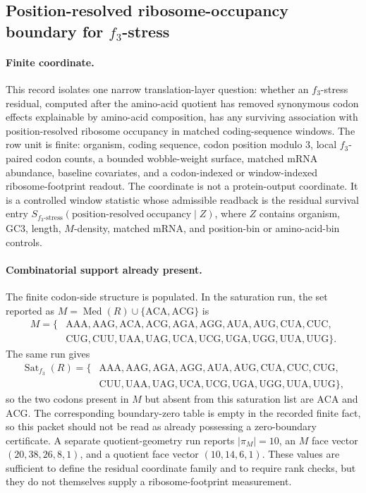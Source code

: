 \subsection{Position-resolved ribosome-occupancy boundary for $f_3$-stress}
\label{sec:q6-f3-stress-position-resolved-ribosome-occupancy-translation-boundary}

\paragraph{Finite coordinate.}
This record isolates one narrow translation-layer question: whether an $f_3$-stress residual, computed after the amino-acid quotient has removed synonymous codon effects explainable by amino-acid composition, has any surviving association with position-resolved ribosome occupancy in matched coding-sequence windows. The row unit is finite: organism, coding sequence, codon position modulo $3$, local $f_3$-paired codon counts, a bounded wobble-weight surface, matched mRNA abundance, baseline covariates, and a codon-indexed or window-indexed ribosome-footprint readout. The coordinate is not a protein-output coordinate. It is a controlled window statistic whose admissible readback is the residual survival entry $S_{f_3\text{-stress}}(\mathrm{position\text{-}resolved\ occupancy}\mid Z)$, where $Z$ contains organism, GC3, length, $M$-density, matched mRNA, and position-bin or amino-acid-bin controls.

\paragraph{Combinatorial support already present.}
The finite codon-side structure is populated. In the saturation run, the set reported as $M=\operatorname{Med}(R)\cup\{\mathrm{ACA},\mathrm{ACG}\}$ is
$$
\begin{aligned}
M=\{&\mathrm{AAA},\mathrm{AAG},\mathrm{ACA},\mathrm{ACG},\mathrm{AGA},\mathrm{AGG},\mathrm{AUA},\mathrm{AUG},\mathrm{CUA},\mathrm{CUC},\\
&\mathrm{CUG},\mathrm{CUU},\mathrm{UAA},\mathrm{UAG},\mathrm{UCA},\mathrm{UCG},\mathrm{UGA},\mathrm{UGG},\mathrm{UUA},\mathrm{UUG}\}.
\end{aligned}
$$
The same run gives
$$
\begin{aligned}
\operatorname{Sat}_{f_3}(R)=\{&\mathrm{AAA},\mathrm{AAG},\mathrm{AGA},\mathrm{AGG},\mathrm{AUA},\mathrm{AUG},\mathrm{CUA},\mathrm{CUC},\mathrm{CUG},\\
&\mathrm{CUU},\mathrm{UAA},\mathrm{UAG},\mathrm{UCA},\mathrm{UCG},\mathrm{UGA},\mathrm{UGG},\mathrm{UUA},\mathrm{UUG}\},
\end{aligned}
$$
so the two codons present in $M$ but absent from this saturation list are $\mathrm{ACA}$ and $\mathrm{ACG}$. The corresponding boundary-zero table is empty in the recorded finite fact, so this packet should not be read as already possessing a zero-boundary certificate. A separate quotient-geometry run reports $|\pi_M|=10$, an $M$ face vector $(20,38,26,8,1)$, and a quotient face vector $(10,14,6,1)$. These values are sufficient to define the residual coordinate family and to require rank checks, but they do not themselves supply a ribosome-footprint measurement.

